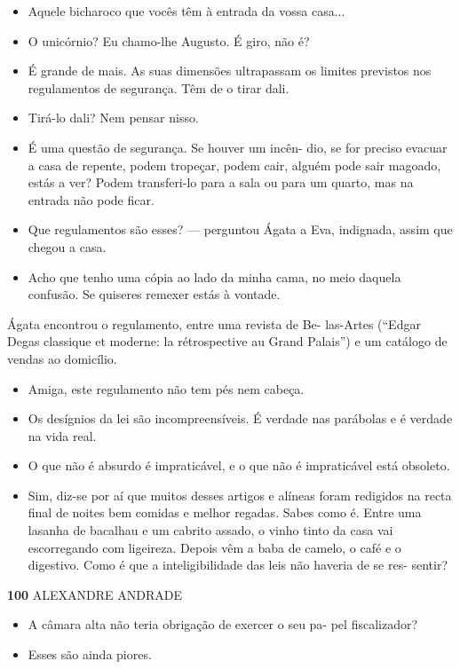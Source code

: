 \begin{itemize}
\tightlist
\item
  Aquele bicharoco que vocês têm à entrada da vossa casa...
\item
  O unicórnio? Eu chamo-lhe Augusto. É giro, não é?
\item
  É grande de mais. As suas dimensões ultrapassam os limites previstos
  nos regulamentos de segurança. Têm de o tirar dali.
\item
  Tirá-lo dali? Nem pensar nisso.
\item
  É uma questão de segurança. Se houver um incên- dio, se for preciso
  evacuar a casa de repente, podem tropeçar, podem cair, alguém pode
  sair magoado, estás a ver? Podem transferi-lo para a sala ou para um
  quarto, mas na entrada não pode ficar.
\item
  Que regulamentos são esses? --- perguntou Ágata a Eva, indignada,
  assim que chegou a casa.
\item
  Acho que tenho uma cópia ao lado da minha cama, no meio daquela
  confusão. Se quiseres remexer estás à vontade.
\end{itemize}

Ágata encontrou o regulamento, entre uma revista de Be- las-Artes
(``Edgar Degas classique et moderne: la rétrospective au Grand Palais'')
e um catálogo de vendas ao domicílio.

\begin{itemize}
\tightlist
\item
  Amiga, este regulamento não tem pés nem cabeça.
\item
  Os desígnios da lei são incompreensíveis. É verdade nas parábolas e é
  verdade na vida real.
\item
  O que não é absurdo é impraticável, e o que não é impraticável está
  obsoleto.
\item
  Sim, diz-se por aí que muitos desses artigos e alíneas foram redigidos
  na recta final de noites bem comidas e melhor regadas. Sabes como é.
  Entre uma lasanha de bacalhau e um cabrito assado, o vinho tinto da
  casa vai escorregando com ligeireza. Depois vêm a baba de camelo, o
  café e o digestivo. Como é que a inteligibilidade das leis não haveria
  de se res- sentir?
\end{itemize}

\textbf{100 }ALEXANDRE ANDRADE

\begin{itemize}
\tightlist
\item
  A câmara alta não teria obrigação de exercer o seu pa- pel
  fiscalizador?
\item
  Esses são ainda piores.
\end{itemize}


